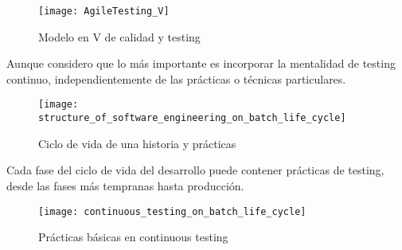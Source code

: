 \begin{figure}[h]
  \centering
  \texttt{[image: AgileTesting\_V]}
  \caption{Modelo en V de calidad y testing}
  \centering
  \label{fig:AgileTesting_V} %
\end{figure}
\FloatBarrier %

Aunque considero que lo más importante es incorporar la mentalidad de testing continuo, independientemente de las prácticas o técnicas particulares.

\begin{figure}[h]
  \centering
  \texttt{[image: structure\_of\_software\_engineering\_on\_batch\_life\_cycle]}
  \caption{Ciclo de vida de una historia y prácticas}
  \centering
  \label{fig:structure_of_software_engineering_on_batch_life_cycle} %
\end{figure}
\FloatBarrier %

Cada fase del ciclo de vida del desarrollo puede contener prácticas de testing, desde las fases más tempranas hasta producción.

\begin{figure}[h]
  \centering
  \texttt{[image: continuous\_testing\_on\_batch\_life\_cycle]}
  \caption{Prácticas básicas en continuous testing}
  \centering
  \label{fig:continuous_testing_on_batch_life_cycle} %
\end{figure}
\FloatBarrier %

